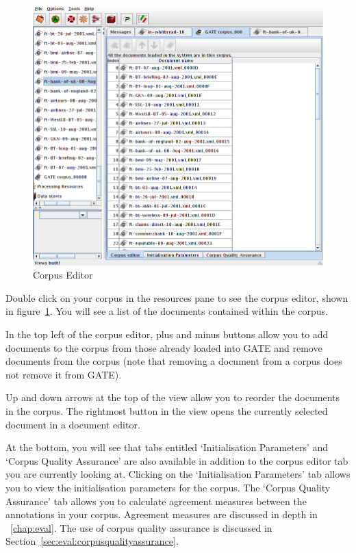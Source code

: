 \begin{figure}[htb]
\begin{center}
\includegraphics[width=14cm]{corpus-editor.png}
\end{center}
\caption{Corpus Editor}
\label{fig:corpuseditor}
\end{figure}

Double click on your corpus in the resources pane to see the corpus
editor, shown in figure~\ref{fig:corpuseditor}. You will see a list of the
documents contained within the corpus.

In the top left of the corpus editor, plus and minus buttons allow you to add
documents to the corpus from those already loaded into GATE and remove
documents from the corpus (note that removing a document from a corpus does not
remove it from GATE).

Up and down arrows at the top of the view allow you to reorder the documents in
the corpus. The rightmost button in the view opens the currently selected
document in a document editor.

At the bottom, you will see that tabs entitled `Initialisation Parameters' and
`Corpus Quality Assurance' are also available in addition to the corpus editor
tab you are currently looking at. Clicking on the `Initialisation Parameters' tab
allows you to view the initialisation parameters for the corpus. The `Corpus
Quality Assurance' tab allows you to calculate agreement measures between the
annotations in your corpus. Agreement measures are discussed in depth in
\Chapthing~\ref{chap:eval}. The use of corpus quality assurance is discussed in
Section~\ref{sec:eval:corpusqualityassurance}.

